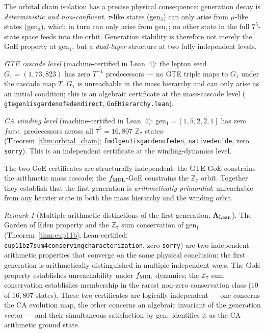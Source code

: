 \documentclass[11pt]{article}
\theoremstyle{remark}
\newtheorem{remark}[theorem]{Remark}
\newcommand{\lean}[1]{%
  \penalty-100
  \begingroup\def\_{\textunderscore\allowbreak}\texttt{#1}\endgroup}
\newcommand{\CatAL}{\ensuremath{\textbf{A}_{\rm Lean}}}
\begin{document}
The orbital chain isolation has a precise physical consequence: generation decay is
\emph{deterministic and non-confluent}.
$\tau$-like states (gen$_3$) can only arise from $\mu$-like states (gen$_2$), which in turn
can only arise from gen$_1$; no other state in the full $7^5$-state space feeds into the orbit.
Generation stability is therefore not merely the GoE property at gen$_1$, but a
\emph{dual-layer} structure at two fully independent levels.

\emph{GTE cascade level} (machine-certified in Lean~4): the lepton seed $G_1 = (1, 73, 823)$ has zero
$T^{-1}$ predecessors --- no GTE triple maps to $G_1$ under the cascade map $T$.
$G_1$ is unreachable in the mass hierarchy and can only arise as an initial condition;
this is an algebraic certificate at the mass-cascade level
(\lean{gte\_gen1\_is\_garden\_of\_eden\_direct}, \lean{GoEHierarchy.lean}).

\emph{CA winding level} (machine-certified in Lean~4): gen$_1 = [1,5,2,2,1]$ has zero $f_{\rm MDL}$
predecessors across all $7^5 = 16{,}807$ $\mathbb{Z}_7$ states
(Theorem~\ref{thm:orbital_chain}; \lean{fmdl\_gen1\_is\_garden\_of\_eden},
\lean{native\_decide}, zero \texttt{sorry}).
This is an independent certificate at the winding-dynamics level.

The two GoE certificates are structurally independent: the GTE-GoE constrains the
arithmetic mass cascade; the $f_{\rm MDL}$-GoE constrains the $\mathbb{Z}_7$ orbit.
Together they establish that the first generation is \emph{arithmetically primordial}:
unreachable from any heavier state in both the mass hierarchy and the winding orbit.

\begin{remark}[Multiple arithmetic distinctions of the first generation, $\CatAL$]
\label{rem:gen1_multiple_distinctions}
The Garden of Eden property and the $\mathbb{Z}_7$ sum conservation of gen$_1$
(Theorem~\ref{thm:cup11b}; Lean-certified: \lean{cup11b\_z7\_sum4\_conserving\_characterization},
zero \texttt{sorry}) are two independent arithmetic properties that converge on the same
physical conclusion: the first generation is arithmetically distinguished in multiple
independent ways.
The GoE property establishes unreachability under $f_{\rm MDL}$ dynamics; the $\mathbb{Z}_7$
sum conservation establishes membership in the rarest non-zero conservation class
($10$ of $16{,}807$ states).
These two certificates are logically independent --- one concerns the CA evolution map,
the other concerns an algebraic invariant of the generation vector --- and their
simultaneous satisfaction by gen$_1$ identifies it as the CA arithmetic ground state.
\end{remark}
\end{document}
